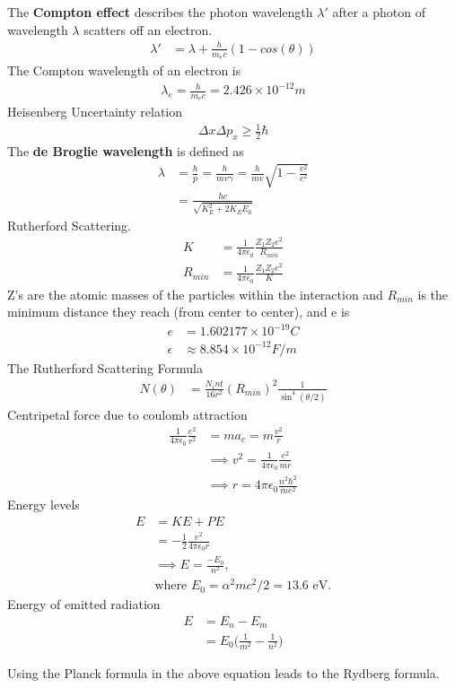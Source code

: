 \begin{multicols}{2}
The \textbf{Compton effect} describes the photon wavelength $\lambda'$ after a photon of wavelength $\lambda$ scatters off an electron.
\begin{align}
\lambda' &= \lambda + \frac{h}{m_ec}(1-cos(\theta)) 
\end{align}
The Compton wavelength of an electron is 
\begin{align}
\lambda_e = \frac{h}{m_ec}= 2.426 \times 10^{-12}m
\end{align}
Heisenberg Uncertainty relation
\begin{align}
	\Delta x \Delta p_x \geq \frac{1}{2}\hbar
\end{align}
The \textbf{de Broglie wavelength} is defined as
\begin{align}
\lambda &= \frac{h}{p} = \frac{h}{mv\gamma} = \frac{h}{mv}\sqrt{1-\frac{v^2}{c^2}} \\ &= \frac{hc}{\sqrt{K_E^2 + 2K_EE_0}}
\end{align}
Rutherford Scattering.
\begin{align}
K &=\frac{1}{4\pi \epsilon_0}\frac{Z_1Z_2e^2}{R_{min}} \\ R_{min} &=\frac{1}{4\pi \epsilon_0}\frac{Z_1Z_2e^2}{K}
\end{align}
Z's are the atomic masses of the particles within the interaction and $R_{min}$ is the minimum distance they reach (from center to center), and e is 
\begin{align}
e &=1.602177\times 10^{-19} C \\
\epsilon &\approx 8.854 \times 10^{-12} F/m
\end{align}
The Rutherford Scattering Formula
\begin{align}
N(\theta) &= \frac{N_int}{16r^2}(R_{min})^2\frac{1}{\sin^4(\theta/2)}
\end{align}
Centripetal force due to coulomb attraction
\begin{align}
\frac{1}{4\pi \epsilon_0} \frac{e^2}{r^2} &=ma_c=m\frac{v^2}{r}\\ &\implies v^2=\frac{1}{4\pi \epsilon_0}\frac{e^2}{mr} \\
&\implies r = 4\pi\epsilon_0\frac{n^2\hbar^2}{me^2}
\end{align}
Energy levels 
\begin{align}
E&=KE+PE \\&= -\frac{1}{2}\frac{e^2}{4\pi \epsilon_0r}\\ &\implies E =\frac{-E_0}{n^2}, \\
&\textrm{where $E_0=\alpha^2mc^2/2 = 13.6$ eV.}
\end{align}
Energy of emitted radiation
\begin{align}
E&=E_n-E_m \\ &= E_0\bigg(\frac{1}{m^2}-\frac{1}{n^2}\bigg)
\end{align}
\begin{note}
	Using the Planck formula in the above equation leads to the Rydberg formula.
\end{note}


\end{multicols}
